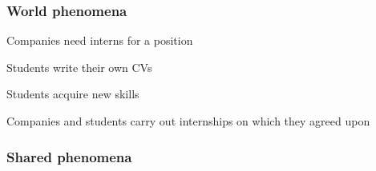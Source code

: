     \subsubsection{World phenomena}
        \begin{enumerate}[label={[WP\arabic*]}]
            \item {Companies need interns for a position}
            \item {Students write their own CVs}
            \item {Students acquire new skills }
            \item {Companies and students carry out internships on which they agreed upon}
        \end{enumerate}

    
    \subsubsection{Shared phenomena}
